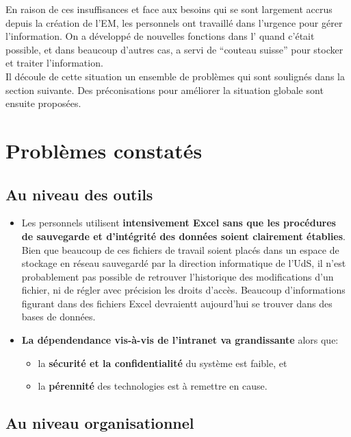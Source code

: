 \documentclass{book}
\begin{document}
En raison de ces insuffisances et face aux  besoins qui se sont largement
accrus depuis la création de l'EM, les personnels ont travaillé dans l'urgence pour gérer 
l'information. On a développé de nouvelles fonctions dans l' quand c'était
possible, et dans beaucoup d'autres cas,  a servi de ``couteau suisse'' pour 
stocker et traiter l'information.\\

Il découle de cette situation un ensemble de problèmes qui sont soulignés dans la section
suivante. Des préconisations pour améliorer la situation globale sont ensuite proposées.

\section{Problèmes constatés}

\subsection{Au niveau des outils}

\begin{itemize}
\item Les personnels utilisent \textbf{intensivement Excel sans que les procédures de 
sauvegarde et d'intégrité des données soient clairement établies}. Bien que beaucoup
de ces fichiers de travail soient placés dans un espace de stockage en réseau sauvegardé
par la direction informatique de l'UdS, il n'est probablement pas possible de retrouver
l'historique des modifications d'un fichier, ni de régler avec précision les droits d'accès.
Beaucoup d'informations figurant dans des fichiers Excel devraientt aujourd'hui se trouver dans
des bases de données.\\

\item \textbf{La dépendendance vis-à-vis de l'intranet va grandissante} alors que:
	\begin{itemize}
	\item la \textbf{sécurité et la confidentialité} du système est faible, et
	\item la \textbf{pérennité} des technologies est à remettre en cause.
	\end{itemize}
\end{itemize}

\subsection{Au niveau organisationnel}
\end{document}

